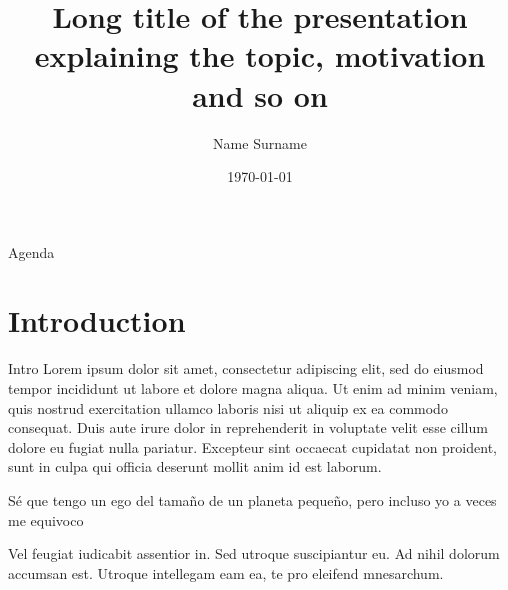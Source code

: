 \documentclass[9pt, xcolor=table]{beamer}
\title[Presentation Short Title] {Long title of the presentation explaining the topic, motivation and so on}
\author[Surname, Name]{Name Surname}
\institute[TH Köln] {Institute, Supervisors, Developer Team or something else}
\date{\today}
\begin{document}
%
\begin{frame}[plain]
	\titlepage
\end{frame}
%
\begin{frame}{Agenda}
	\tableofcontents
\end{frame}
%
%
\section{Introduction}
\begin{frame}{Intro}
	\vfill
	Lorem ipsum dolor sit amet, consectetur adipiscing elit, sed do eiusmod tempor incididunt ut labore et dolore magna aliqua. Ut enim ad minim veniam, quis nostrud exercitation ullamco laboris nisi ut aliquip ex ea commodo consequat. Duis aute irure dolor in reprehenderit in voluptate velit esse cillum dolore eu fugiat nulla pariatur. Excepteur sint occaecat cupidatat non proident, sunt in culpa qui officia deserunt mollit anim id est laborum.
	\vfill
    \begin{displayquote}
    Sé que tengo un ego del tamaño de un planeta pequeño, pero incluso yo a 
    veces me equivoco
    \end{displayquote}
	\vfill
	Vel feugiat iudicabit assentior in. Sed utroque suscipiantur eu. Ad nihil dolorum accumsan est. Utroque intellegam eam ea, te pro eleifend mnesarchum.
	\vfill
\end{frame}
%
\end{document}
